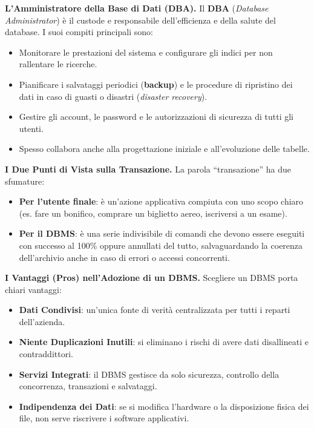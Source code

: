 \documentclass[12pt]{extarticle}
\begin{document}
\medskip
\noindent \textbf{L'Amministratore della Base di Dati (DBA).} Il \textbf{DBA} (\textit{Database Administrator}) è il custode e responsabile dell'efficienza e della salute del database. I suoi compiti principali sono:
\begin{itemize}
    \item Monitorare le prestazioni del sistema e configurare gli indici per non rallentare le ricerche.
    \item Pianificare i salvataggi periodici (\textbf{backup}) e le procedure di ripristino dei dati in caso di guasti o disastri (\textit{disaster recovery}).
    \item Gestire gli account, le password e le autorizzazioni di sicurezza di tutti gli utenti.
    \item Spesso collabora anche alla progettazione iniziale e all'evoluzione delle tabelle.
\end{itemize}

\medskip
\noindent \textbf{I Due Punti di Vista sulla Transazione.} La parola ``transazione'' ha due sfumature:
\begin{itemize}
    \item \textbf{Per l'utente finale}: è un'azione applicativa compiuta con uno scopo chiaro (es. fare un bonifico, comprare un biglietto aereo, iscriversi a un esame).
    \item \textbf{Per il DBMS}: è una serie indivisibile di comandi che devono essere eseguiti con successo al 100\% oppure annullati del tutto, salvaguardando la coerenza dell'archivio anche in caso di errori o accessi concorrenti.
\end{itemize}

\medskip
\noindent \textbf{I Vantaggi (Pros) nell'Adozione di un DBMS.} Scegliere un DBMS porta chiari vantaggi:
\begin{itemize}
    \item \textbf{Dati Condivisi}: un'unica fonte di verità centralizzata per tutti i reparti dell'azienda.
    \item \textbf{Niente Duplicazioni Inutili}: si eliminano i rischi di avere dati disallineati e contraddittori.
    \item \textbf{Servizi Integrati}: il DBMS gestisce da solo sicurezza, controllo della concorrenza, transazioni e salvataggi.
    \item \textbf{Indipendenza dei Dati}: se si modifica l'hardware o la disposizione fisica dei file, non serve riscrivere i software applicativi.
\end{itemize}
\end{document}
